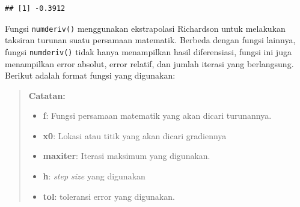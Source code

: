 \documentclass[]{book}
\newenvironment{Shaded}{\begin{snugshade}}{\end{snugshade}}
\newcommand{\CommentTok}[1]{\textcolor[rgb]{0.56,0.35,0.01}{\textit{#1}}}
\newcommand{\ControlFlowTok}[1]{\textcolor[rgb]{0.13,0.29,0.53}{\textbf{#1}}}
\newcommand{\DataTypeTok}[1]{\textcolor[rgb]{0.13,0.29,0.53}{#1}}
\newcommand{\DecValTok}[1]{\textcolor[rgb]{0.00,0.00,0.81}{#1}}
\newcommand{\KeywordTok}[1]{\textcolor[rgb]{0.13,0.29,0.53}{\textbf{#1}}}
\newcommand{\NormalTok}[1]{#1}
\newcommand{\OperatorTok}[1]{\textcolor[rgb]{0.81,0.36,0.00}{\textbf{#1}}}
\newcommand{\StringTok}[1]{\textcolor[rgb]{0.31,0.60,0.02}{#1}}
\providecommand{\tightlist}{%
  \setlength{\itemsep}{0pt}\setlength{\parskip}{0pt}}
\theoremstyle{definition}
\theoremstyle{definition}
\theoremstyle{definition}
\theoremstyle{remark}
\begin{document}
\begin{Shaded}
\end{Shaded}

\begin{verbatim}
## [1] -0.3912
\end{verbatim}

Fungsi \texttt{numderiv()} menggunakan ekstrapolasi Richardson untuk melakukan taksiran turunan suatu persamaan matematik. Berbeda dengan fungsi lainnya, fungsi \texttt{numderiv()} tidak hanya menampilkan hasil diferensiasi, fungsi ini juga menampilkan error absolut, error relatif, dan jumlah iterasi yang berlangsung. Berikut adalah format fungsi yang digunakan:

\begin{Shaded}
\end{Shaded}

\begin{quote}
\textbf{Catatan:}

\begin{itemize}
\tightlist
\item
  \textbf{f}: Fungsi persamaan matematik yang akan dicari turunannya.
\item
  \textbf{x0}: Lokasi atau titik yang akan dicari gradiennya
\item
  \textbf{maxiter}: Iterasi maksimum yang digunakan.
\item
  \textbf{h}: \emph{step size} yang digunakan
\item
  \textbf{tol}: toleransi error yang digunakan.
\end{itemize}
\end{quote}
\end{document}
